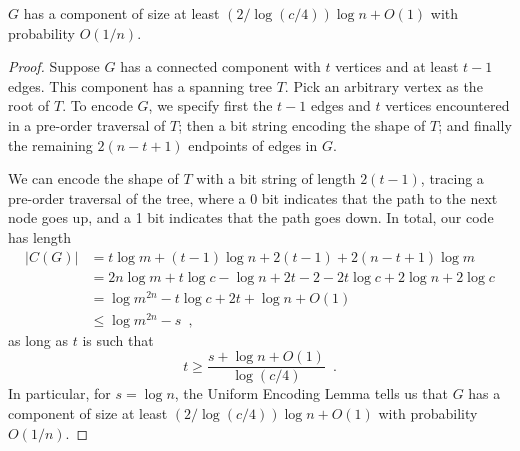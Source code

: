 \documentclass{patmorin}
\begin{document}
\begin{lem}
  $G$ has a component of size at least $(2/\log(c/4))\log n + O(1)$
  with probability $O(1/n)$.
\end{lem}
\begin{proof}
  Suppose $G$ has a connected component with $t$ vertices and at least
  $t-1$ edges. This component has a spanning tree $T$. Pick an
  arbitrary vertex as the root of $T$. To encode $G$, we specify
  first the $t - 1$ edges and $t$ vertices encountered in a pre-order
  traversal of $T$; then a bit string encoding the shape of $T$; and
  finally the remaining $2(n - t + 1)$ endpoints of edges in $G$.

  We can encode the shape of $T$ with a bit string of length
  $2(t - 1)$, tracing a pre-order traversal of the tree, where a 0 bit
  indicates that the path to the next node goes up, and a 1 bit indicates
  that the path goes down. In total, our code has length
  \begin{align*}
    |C(G)| &= t \log m + (t - 1) \log n + 2(t - 1) + 2 (n - t + 1) \log m \\
           &= 2n\log m + t \log c - \log n + 2t - 2 - 2t \log c + 2\log n + 2 \log c \tag{since $m = cn$}\\
           &= \log m^{2n} - t \log c + 2t + \log n + O(1) \\
           &\le \log m^{2n} - s \enspace ,
  \end{align*}
  as long as $t$ is such that
  \[
    t \geq \frac{s + \log n + O(1)}{\log (c/4)} \enspace .
  \]
  In particular, for $s = \log n$, the Uniform
  Encoding Lemma tells us that $G$ has a component of size at least
  $(2/\log (c/4))\log n + O(1)$ with probability $O(1/n)$.
\end{proof}
\end{document}
